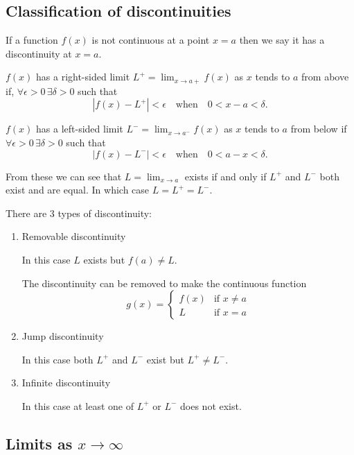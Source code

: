 \documentclass[10pt, a4paper]{article}
\begin{document}
\subsection{Classification of discontinuities}
If a function $f(x)$ is not continuous at a point $x = a$ then we say it has a discontinuity at $x = a$.

\begin{definition}
    $f(x)$ has a right-sided limit $L^+ = \lim_{x \rightarrow a+}f(x)$ as $x$ tends to $a$ from above if, $\forall\epsilon > 0\, \exists\delta > 0$ such that
    \[
    |f(x) - L^+| < \epsilon\quad\text{when}\quad 0 < x - a < \delta.
    \]
\end{definition}

\begin{definition}
    $f(x)$ has a left-sided limit $L^- = \lim_{x \rightarrow a^-}f(x)$ as $x$ tends to $a$ from below if $\forall\epsilon > 0\, \exists\delta > 0$ such that
    \[
    |f(x) - L^-| < \epsilon\quad\text{when}\quad 0 < a - x < \delta.
    \]
\end{definition}

From these we can see that $L = \lim_{x \rightarrow a}$ exists if and only if $L^+$ and $L^-$ both exist and are equal. In which case $L = L^+ = L^-$.

There are $3$ types of discontinuity:
\begin{enumerate}[label = (\roman*)]
    \item Removable discontinuity

    In this case $L$ exists but $f(a) \neq L$.

    The discontinuity can be removed to make the continuous function
    \[
    g(x) = \begin{cases}
        f(x) &\text{if } x \neq a \\
        L &\text{if } x = a
    \end{cases}
    \]

    \item Jump discontinuity

    In this case both $L^+$ and $L^-$ exist but $L^+ \neq L^-$.

    \item Infinite discontinuity

    In this case at least one of $L^+$ or $L^-$ does not exist.
\end{enumerate}

\subsection{Limits as \texorpdfstring{$x \rightarrow \infty$}{}}
\end{document}
